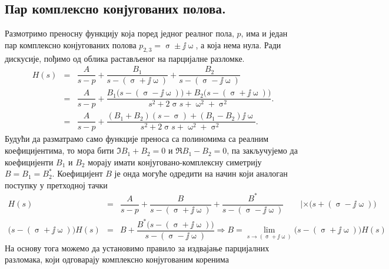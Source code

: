 \begin{center}
\end{center}

\subsection*{Пар комплексно конјугованих полова.}

Размотримо преносну функцију која поред једног реалног пола, $p$, има и један пар комплексно конјугованих полова
$p_{2,3} = \upsigma \pm \jj\upomega$, а која нема нула. Ради дискусије, пођимо од облика растављеног на парцијалне разломке. 
%
\begin{eqnarray}
    H(s) 
    &=& 
    \dfrac{A}{s - p} + 
    \dfrac{B_1}{s - (\upsigma + \jj\upomega)} + 
    \dfrac{B_2}{s - (\upsigma - \jj\upomega)} 
    \\
    &=& 
    \dfrac{A}{s - p} + 
    \dfrac{
        B_1 \bigl( s - (\upsigma - \jj\upomega) \bigr)
        +
        B_2 \bigl( s - (\upsigma + \jj\upomega) \bigr)
     }{s^2 + 2 \upsigma s + \upomega^2 + \upsigma^2}.  \\[2mm] 
     &=&
     \dfrac{A}{s - p} + 
     \dfrac{
         (B_1 + B_2)(s - \upsigma) +   
         (B_1 - B_2)\jj\upomega
      }{s^2 + 2 \upsigma s + \upomega^2 + \upsigma^2}. 
\end{eqnarray}
%
Будући да разматрамо само функције преноса са полиномима са реалним коефицијентима, то мора бити 
$\Im{B_1 + B_2} = 0$ и $\Re{B_1 - B_2} = 0$, па закључујемо да коефицијенти $B_1$ и $B_2$ морају 
имати конјуговано-комплексну симетрију $B = B_1 = B_2^\ast$. Коефицијент $B$ је онда могуће 
одредити на начин који аналоган поступку у претходној тачки
\begin{eqnarray}
    H(s) 
    &=& 
    \dfrac{A}{s - p} + 
    \dfrac{B}{s - (\upsigma + \jj\upomega)} + 
    \dfrac{B^\ast}{s - (\upsigma - \jj\upomega)} \qquad | \times \bigl( s + (\upsigma - \jj\upomega) \bigr)
    \\
    \bigl( s - (\upsigma + \jj\upomega) \bigr)
    H(s) 
    &=& B + 
    \dfrac{
        B^\ast \bigl( s - (\upsigma + \jj\upomega) \bigr)
    }{s - (\upsigma - \jj\upomega)}
    \Rightarrow
    B = \lim_{{s \to (\upsigma + \jj\upomega)}}  \bigl( s - (\upsigma + \jj\upomega) \bigr)
    H(s) 
\end{eqnarray}
На основу тога можемо да установимо правило за издвајање парцијалних разломака, који одговарају 
комплексно конјугованим коренима 

